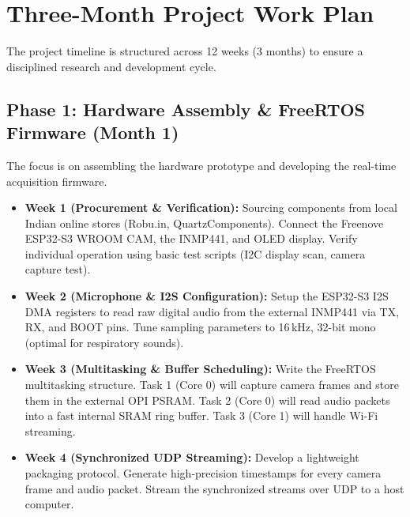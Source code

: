 \documentclass[11pt,a4paper]{article}
\begin{document}
\section{Three-Month Project Work Plan}
The project timeline is structured across 12 weeks (3 months) to ensure a disciplined research and development cycle. 

\subsection{Phase 1: Hardware Assembly \& FreeRTOS Firmware (Month 1)}
The focus is on assembling the hardware prototype and developing the real-time acquisition firmware.
\begin{itemize}
    \item \textbf{Week 1 (Procurement \& Verification):} Sourcing components from local Indian online stores (Robu.in, QuartzComponents). Connect the Freenove ESP32-S3 WROOM CAM, the INMP441, and OLED display. Verify individual operation using basic test scripts (I2C display scan, camera capture test).
    \item \textbf{Week 2 (Microphone \& I2S Configuration):} Setup the ESP32-S3 I2S DMA registers to read raw digital audio from the external INMP441 via TX, RX, and BOOT pins. Tune sampling parameters to 16\,kHz, 32-bit mono (optimal for respiratory sounds).
    \item \textbf{Week 3 (Multitasking \& Buffer Scheduling):} Write the FreeRTOS multitasking structure. Task 1 (Core 0) will capture camera frames and store them in the external OPI PSRAM. Task 2 (Core 0) will read audio packets into a fast internal SRAM ring buffer. Task 3 (Core 1) will handle Wi-Fi streaming.
    \item \textbf{Week 4 (Synchronized UDP Streaming):} Develop a lightweight packaging protocol. Generate high-precision timestamps for every camera frame and audio packet. Stream the synchronized streams over UDP to a host computer.
\end{itemize}
\end{document}
